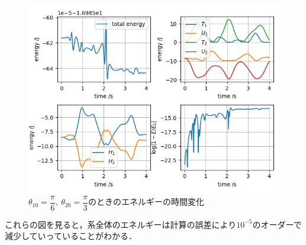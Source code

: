 \documentclass[a4paper,11pt]{jsarticle}
\begin{document}
\begin{figure}[H]
  \begin{center}
    \includegraphics{figure/RK42/evaluation2/pi6_pi2_2021-2-9-13308.jpeg}
    \caption{\(\theta_{10} = \dfrac{\pi}{6},\ \theta_{20}  = \dfrac{\pi}{3}\)のときのエネルギーの時間変化}
    \label{fig:RK42-eval2-pi6-pi3}
  \end{center}
\end{figure}
これらの図を見ると，系全体のエネルギーは計算の誤差により\(10^{-5}\)のオーダーで減少していっていることがわかる．

\newpage
\end{document}
